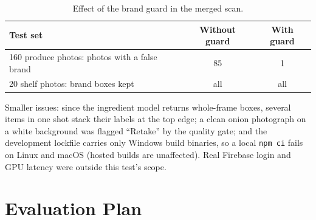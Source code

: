 \documentclass[journal]{IEEEtran}
\begin{document}
\begin{table}[!tb]
\caption{Effect of the brand guard in the merged scan.}
\label{tab:guard}
\centering
\footnotesize
\setlength{\tabcolsep}{4pt}
\begin{tabular}{l c c}
\toprule
\textbf{Test set} & \textbf{Without guard} & \textbf{With guard} \\
\midrule
160 produce photos: photos with a false brand & 85 & 1 \\
20 shelf photos: brand boxes kept & all & all \\
\bottomrule
\end{tabular}
\end{table}

Smaller issues: since the ingredient model returns whole-frame
boxes, several items in one shot stack their labels at the top edge;
a clean onion photograph on a white background was flagged
``Retake'' by the quality gate; and the development lockfile carries
only Windows build binaries, so a local \texttt{npm ci} fails on
Linux and macOS (hosted builds are unaffected). Real Firebase login
and GPU latency were outside this test's scope.

\section{Evaluation Plan}
\label{sec:eval}
\end{document}

